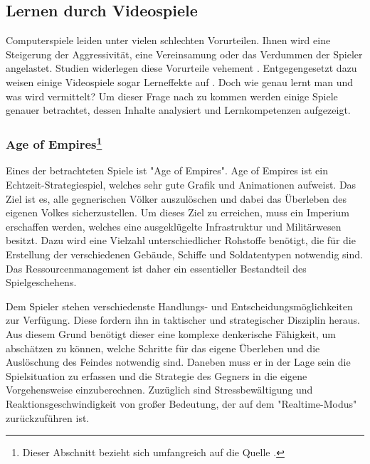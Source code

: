 \newpage
\subsection{Lernen durch Videospiele}
Computerspiele leiden unter vielen schlechten Vorurteilen. Ihnen wird eine Steigerung der Aggressivität, eine Vereinsamung oder das Verdummen der Spieler angelastet. Studien widerlegen diese Vorurteile vehement \cite{psylex.de2012}. Entgegengesetzt dazu weisen einige Videospiele sogar Lerneffekte auf \cite{paradisiredaktion2010}. Doch wie genau lernt man und was wird vermittelt? Um dieser Frage nach zu kommen werden einige Spiele genauer betrachtet, dessen Inhalte analysiert und Lernkompetenzen aufgezeigt. 

\subsubsection[Age of Empires]{Age of Empires\footnote{Dieser Abschnitt bezieht sich umfangreich auf die Quelle \cite{bundeszentralefuerpolitischebildung2005}.}}
Eines der betrachteten Spiele ist "{}Age of Empires"{}. Age of Empires ist ein Echtzeit-Strategiespiel, welches sehr gute Grafik und Animationen aufweist. Das Ziel ist es, alle gegnerischen Völker auszulöschen und dabei das Überleben des eigenen Volkes sicherzustellen. Um dieses Ziel zu erreichen, muss ein Imperium erschaffen werden, welches eine ausgeklügelte Infrastruktur und Militärwesen besitzt. Dazu wird eine Vielzahl unterschiedlicher Rohstoffe benötigt, die für die Erstellung der verschiedenen Gebäude, Schiffe und Soldatentypen notwendig sind. Das Ressourcenmanagement ist daher ein essentieller Bestandteil des Spielgeschehens.

Dem Spieler stehen verschiedenste Handlungs- und Entscheidungsmöglichkeiten zur Verfügung. Diese fordern ihn in taktischer und strategischer Disziplin heraus. Aus diesem Grund benötigt dieser eine komplexe denkerische Fähigkeit, um abschätzen zu können, welche Schritte für das eigene Überleben und die Auslöschung des Feindes notwendig sind. Daneben muss er in der Lage sein die Spielsituation zu erfassen und die Strategie des Gegners in die eigene Vorgehensweise einzuberechnen. Zuzüglich sind Stressbewältigung und Reaktionsgeschwindigkeit von großer Bedeutung, der auf dem "{}Realtime-Modus"{} zurückzuführen ist. 

